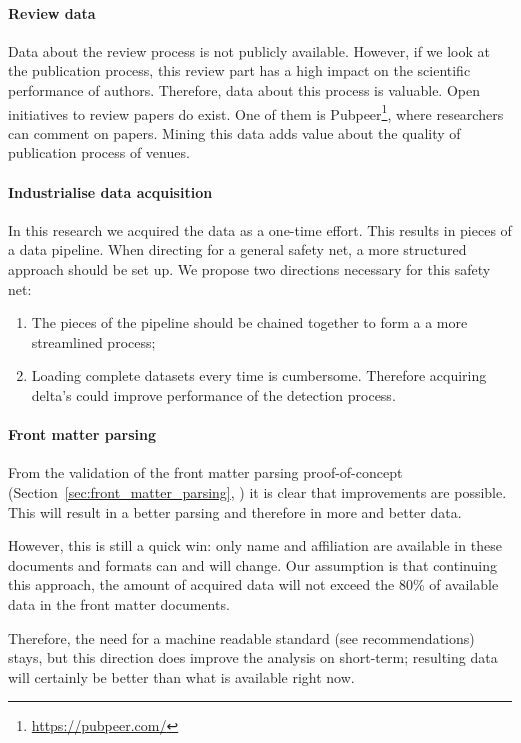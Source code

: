 \documentclass{ou-report}
\begin{document}
\paragraph{Review data}
Data about the review process is not publicly available. However, if we look at
the publication process, this review part has a high impact on the scientific 
performance of authors. Therefore, data about this process is valuable.
Open initiatives to review papers do exist. One of them is
Pubpeer\footnote{\url{https://pubpeer.com/}}, 
where researchers can comment on papers.
Mining this data adds value about the quality of publication process of 
venues.

\paragraph{Industrialise data acquisition}
In this research we acquired the data as a one-time effort.
This results in pieces of a data pipeline.
When directing for a general safety net, a more structured approach should be 
set up. We propose two directions necessary for this safety net:
\begin{enumerate}
    \item The pieces of the pipeline should be chained together to form a
        a more streamlined process;
    \item Loading complete datasets every time is cumbersome. Therefore acquiring 
    delta’s could improve performance of the detection process.
\end{enumerate}

\paragraph{Front matter parsing}
From the validation of the front matter parsing proof-of-concept
(Section~\ref{sec:front_matter_parsing}, ) 
it is clear that improvements are 
possible. This will result in a better parsing and therefore in more and better 
data.

However, this is still a quick win: only name and affiliation are available in 
these documents and formats can and will change. Our assumption is that 
continuing this approach, the amount of acquired data will not exceed the 80\% 
of available data in the front matter documents.

Therefore, the need for a machine readable standard (see recommendations) stays, 
but this direction does improve the analysis on short-term; resulting data will 
certainly be better than what is available right now.
\end{document}
